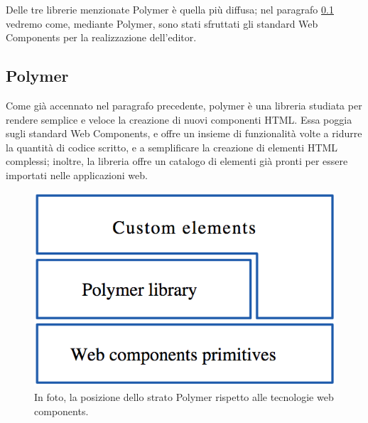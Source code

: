 Delle tre librerie menzionate Polymer è quella più diffusa; nel paragrafo \ref{sec:chapter_tecnologie_abilitanti_polymer} vedremo come, mediante Polymer, sono stati sfruttati gli standard Web Components per la realizzazione dell’editor.

\subsection{Polymer}
\label{sec:chapter_tecnologie_abilitanti_polymer}
Come già accennato nel paragrafo precedente, polymer è una libreria studiata per rendere semplice e veloce la creazione di nuovi componenti HTML. Essa poggia sugli standard Web Components, e offre un insieme di funzionalità volte a ridurre la quantità di codice scritto, e a semplificare la creazione di elementi HTML complessi; inoltre, la libreria offre un catalogo di elementi già pronti per essere importati nelle applicazioni web. 
\\
\begin{figure}[htb]
 \centering
 \includegraphics[width=0.5\linewidth]{images/chapter_tecnologie_abilitanti/tecnologie_abilitanti_polymer_stack.png}\hfill
 \caption[Strato Polymer]{In foto, la posizione dello strato Polymer rispetto alle tecnologie web components.}
 \label{fig:tecnologie_abilitanti_polymer_stack}
\end{figure}

